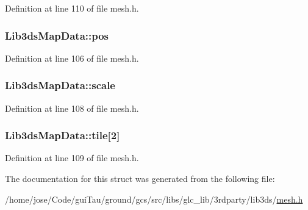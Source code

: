 Definition at line 110 of file mesh.\-h.

\hypertarget{struct_lib3ds_map_data_a98e473bbd358222ab5d461820f24d03a}{
\subsubsection[{pos}]{ Lib3ds\-Map\-Data\-::pos}}\label{struct_lib3ds_map_data_a98e473bbd358222ab5d461820f24d03a}


Definition at line 106 of file mesh.\-h.

\hypertarget{struct_lib3ds_map_data_aa5d8a87386fb073ef9569e7d2919986a}{
\subsubsection[{scale}]{ Lib3ds\-Map\-Data\-::scale}}\label{struct_lib3ds_map_data_aa5d8a87386fb073ef9569e7d2919986a}


Definition at line 108 of file mesh.\-h.

\hypertarget{struct_lib3ds_map_data_aac604212c5a873a0954196fe73e1d2ca}{
\subsubsection[{tile}]{ Lib3ds\-Map\-Data\-::tile\mbox{[}2\mbox{]}}}\label{struct_lib3ds_map_data_aac604212c5a873a0954196fe73e1d2ca}


Definition at line 109 of file mesh.\-h.



The documentation for this struct was generated from the following file\-:\begin{DoxyCompactItemize}
\item 
/home/jose/\-Code/gui\-Tau/ground/gcs/src/libs/glc\-\_\-lib/3rdparty/lib3ds/\hyperlink{mesh_8h}{mesh.\-h}\end{DoxyCompactItemize}
